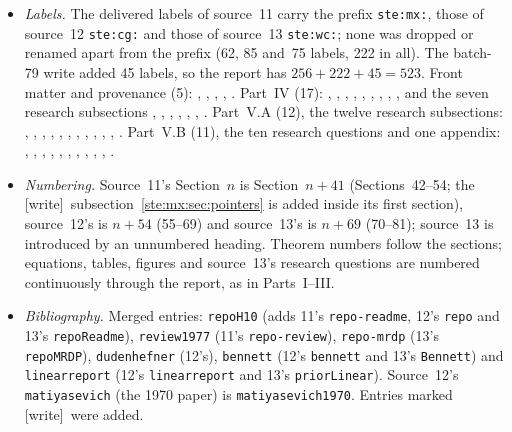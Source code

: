 \documentclass[11pt,letterpaper]{article}
\theoremstyle{definition}
\theoremstyle{remark}
\newcommand{\wtag}{\textup{[write]}}
\begin{document}
\begin{itemize}
\item \emph{Labels.} The delivered labels of source~11 carry the prefix \texttt{ste:mx:}, those of source~12 \texttt{ste:cg:} and those of source~13 \texttt{ste:wc:}; none was dropped or renamed apart from the prefix (62, 85 and~75 labels, 222 in all). The batch-79 write added 45 labels, so the report has $256+222+45=523$. Front matter and provenance (5): , , , , . Part~IV (17): , , , , , , , , ,  and the seven research subsections , , , , , , . Part~V.A (12), the twelve research subsections: , , , , , , , , , , , . Part~V.B (11), the ten research questions and one appendix: , , , , , , , , , , .
\item \emph{Numbering.} Source~11's Section~$n$ is Section~$n+41$ (Sections~42--54; the \wtag\ subsection~\ref{ste:mx:sec:pointers} is added inside its first section), source~12's is $n+54$ (55--69) and source~13's is $n+69$ (70--81); source~13 is introduced by an unnumbered heading. Theorem numbers follow the sections; equations, tables, figures and source~13's research questions are numbered continuously through the report, as in Parts~I--III.
\item \emph{Bibliography.} Merged entries: \texttt{repoH10} (adds 11's \texttt{repo-readme}, 12's \texttt{repo} and 13's \texttt{repoReadme}), \texttt{review1977} (11's \texttt{repo-review}), \texttt{repo-mrdp} (13's \texttt{repoMRDP}), \texttt{dudenhefner} (12's), \texttt{bennett} (12's \texttt{bennett} and 13's \texttt{Bennett}) and \texttt{linearreport} (12's \texttt{linearreport} and 13's \texttt{priorLinear}). Source~12's \texttt{matiyasevich} (the 1970 paper) is \texttt{matiyasevich1970}. Entries marked \wtag\ were added.

\end{itemize}
\end{document}
